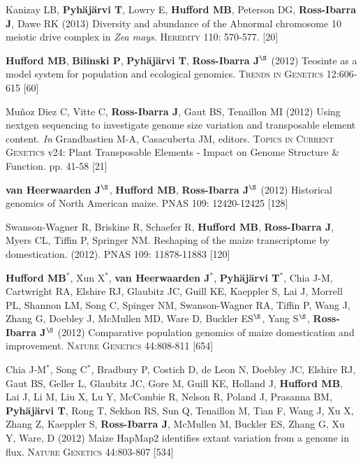 \documentclass[letterpaper,10pt]{article}
\begin{document}
\begin{etaremune}
\item Kanizay LB, {\bf Pyh\"aj\"arvi T}, Lowry E, {\bf Hufford MB}, Peterson DG, {\bf Ross-Ibarra J}, Dawe RK (2013) Diversity and abundance of the Abnormal chromosome 10 meiotic drive complex in \emph{Zea mays}. \textsc{Heredity} 110: 570-577.
 [20]\\


\item {\bf Hufford MB}, {\bf Bilinski P}, {\bf Pyh\"aj\"arvi T}, {\bf Ross-Ibarra J}$^\S$ (2012) Teosinte as a model system for population and ecological genomics. \textsc{Trends in Genetics} 12:606-615 %
 [60]\\


\item Mu\~{n}oz Diez C, Vitte C, {\bf Ross-Ibarra J}, Gaut BS, Tenaillon MI (2012) Using nextgen sequencing to investigate genome size variation and transposable element content. \emph{In} Grandbastien M-A, Casacuberta JM, editors. \textsc{Topics in Current Genetics} v24: Plant Transposable Elements - Impact on Genome Structure \& Function. pp. 41-58
 [21]\\


\item  {\bf van Heerwaarden J}$^\S$, {\bf Hufford MB}, {\bf Ross-Ibarra J}$^\S$ (2012) Historical genomics of North American maize. \textsc{PNAS} 109: 12420-12425
 [128]\\


\item Swanson-Wagner R, Briskine R, Schaefer R, {\bf Hufford MB}, {\bf Ross-Ibarra J}, Myers CL, Tiffin P, Springer NM.  Reshaping of the maize transcriptome by domestication. (2012). \textsc{PNAS}  109: 11878-11883
 [120]\\


\item {\bf Hufford MB}$^*$, Xun X$^*$, {\bf van Heerwaarden J}$^*$, {\bf Pyh\"aj\"arvi T}$^*$, Chia J-M, Cartwright RA, Elshire RJ, Glaubitz JC, Guill KE, Kaeppler S, Lai J, Morrell PL, Shannon LM, Song C, Spinger NM, Swanson-Wagner RA, Tiffin P, Wang J, Zhang G, Doebley J, McMullen MD, Ware D, Buckler ES$^\S$, Yang S$^\S$, {\bf Ross-Ibarra J}$^\S$ (2012) Comparative population genomics of maize domestication and improvement. \textsc{Nature Genetics} 44:808-811 %
 [654]\\


\item  Chia J-M$^*$, Song C$^*$, Bradbury P, Costich D, de Leon N, Doebley JC, Elshire RJ, Gaut BS, Geller L, Glaubitz JC, Gore M, Guill KE, Holland J,  {\bf Hufford MB}, Lai J, Li M, Liu X, Lu Y, McCombie R, Nelson R, Poland J, Prasanna BM,  {\bf Pyh\"aj\"arvi T}, Rong T, Sekhon RS,  Sun Q, Tenaillon M, Tian F, Wang J, Xu X, Zhang Z, Kaeppler S, {\bf Ross-Ibarra J}, McMullen M, Buckler ES, Zhang G, Xu Y, Ware, D (2012) Maize HapMap2 identifies extant variation from a genome in flux. \textsc{Nature Genetics} 44:803-807 %
 [534]\\



\end{etaremune}
\end{document}
